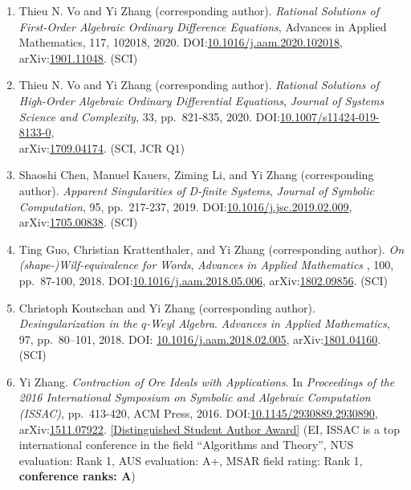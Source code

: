 \documentclass[a4paper,12pt]{article}
\begin{document}
\begin{enumerate}
 DOI:\href{https://doi.org/10.1016/j.jmva.2020.104642}{10.1016/j.jmva.2020.104642}, 
 arXiv:\href{http://arxiv.org/abs/1903.10099}{1903.10099}. (SCI, JCR Q1)
 \item Thieu N. Vo and Yi Zhang (corresponding author). 
{\em Rational Solutions of First-Order Algebraic Ordinary Difference Equations},  Advances in Applied Mathematics, 117, 102018, 2020. 
DOI:\href{https://doi.org/10.1016/j.aam.2020.102018}{10.1016/j.aam.2020.102018},
arXiv:\href{http://arxiv.org/abs/1901.11048}{1901.11048}. (SCI)
 \item Thieu N. Vo and Yi Zhang (corresponding author). {\em Rational Solutions of High-Order Algebraic Ordinary Differential Equations},  {\em Journal of Systems Science and Complexity}, 33, pp.\ 821-835, 2020. DOI:\href{https://link.springer.com/article/10.1007/s11424-019-8133-0}{10.1007/s11424-019-8133-0}, \\
 arXiv:\href{https://arxiv.org/abs/1709.04174}{1709.04174}. (SCI, JCR Q1)
  \item Shaoshi Chen, Manuel Kauers, Ziming Li, and Yi Zhang (corresponding author). {\em Apparent Singularities of D-finite Systems}, 
 {\em  Journal of Symbolic Computation},  95, pp.\ 217-237, 2019. DOI:\href{https://doi.org/10.1016/j.jsc.2019.02.009}{10.1016/j.jsc.2019.02.009}, arXiv:\href{http://arxiv.org/abs/1705.00838}{1705.00838}. (SCI)
\item Ting Guo, Christian Krattenthaler, and Yi Zhang (corresponding author).
{\em On (shape-)Wilf-equivalence for Words}, 
{\em  Advances in Applied Mathematics} , 100, pp.\ 87-100, 2018. 
DOI:\href{https://doi.org/10.1016/j.aam.2018.05.006}{10.1016/j.aam.2018.05.006}, 
arXiv:\href{https://arxiv.org/pdf/1802.09856.pdf}{1802.09856}. (SCI)
\item Christoph Koutschan and Yi Zhang (corresponding author). {\em Desingularization in the $q$-Weyl Algebra}. 
{\em Advances in Applied Mathematics}, 97, pp.\ 80–101, 2018. 
DOI: \href{http://dx.doi.org/10.1016/j.aam.2018.02.005}{10.1016/j.aam.2018.02.005},
arXiv:\href{https://arxiv.org/abs/1801.04160}{1801.04160}. (SCI) 
\item Yi Zhang. {\em Contraction of Ore Ideals with Applications}. 
In {\em Proceedings of the 2016 International Symposium on Symbolic and Algebraic Computation (ISSAC)}, 
pp.\ 413-420, ACM Press, 2016. DOI:\href{http://dl.acm.org/citation.cfm?id=2930890}{10.1145/2930889.2930890},
arXiv:\href{https://arxiv.org/abs/1511.07922}{1511.07922}. 
\href{https://www.sigsam.org/Awards/ISSACAwards.html}{[Distinguished Student Author Award]} 
(EI, ISSAC is a top international conference in the field ``Algorithms and Theory'', NUS evaluation: Rank 1, AUS evaluation: A+, MSAR field rating: Rank 1, \textbf{conference ranks: A}) 
\end{enumerate}
\end{document}
